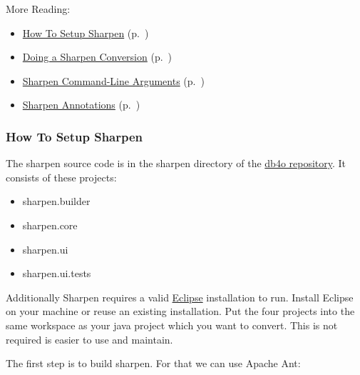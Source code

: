 More Reading:

\begin{itemize}
\item \hyperref[ref:community-working-with-source-sharpen-how-to-setup-sharpen]{How To Setup Sharpen} (p.~\pageref{ref:community-working-with-source-sharpen-how-to-setup-sharpen})
\item \hyperref[ref:community-working-with-source-sharpen-example-conversion]{Doing a Sharpen Conversion} (p.~\pageref{ref:community-working-with-source-sharpen-example-conversion})
\item \hyperref[ref:community-working-with-source-sharpen-sharpen-command-line-arguments]{Sharpen Command-Line Arguments} (p.~\pageref{ref:community-working-with-source-sharpen-sharpen-command-line-arguments})
\item \hyperref[ref:community-working-with-source-sharpen-sharpen-annotations]{Sharpen Annotations} (p.~\pageref{ref:community-working-with-source-sharpen-sharpen-annotations})
\end{itemize}

\subsubsection{How To Setup Sharpen}
\label{ref:community-working-with-source-sharpen-how-to-setup-sharpen}

The sharpen source code is in the sharpen directory of the \href{https://github.com/blakemcbride/db4o}{db4o repository}. It consists of these projects:

\begin{itemize}
\item sharpen.builder
\item sharpen.core
\item sharpen.ui
\item sharpen.ui.tests
\end{itemize}

Additionally Sharpen requires a valid \href{http://eclipse.org/}{Eclipse} installation to run. Install Eclipse on your machine or reuse an existing installation. Put the four projects into the same workspace as your java project which you want to convert. This is not required is easier to use and maintain.

The first step is to build sharpen. For that we can use Apache Ant:

